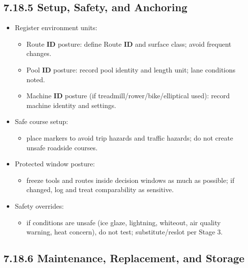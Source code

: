 \documentclass[10pt]{article}
\begin{document}
\subsection*{7.18.5 Setup, Safety, and Anchoring}
{}

\begin{itemize}
\item Register environment units:
  \begin{itemize}
  \item Route \textbf{ID} posture: define Route \textbf{ID} and surface class; avoid frequent changes.
  \item Pool \textbf{ID} posture: record pool identity and length unit; lane conditions noted.
  \item Machine \textbf{ID} posture (if treadmill/rower/bike/elliptical used): record machine identity and settings.
  \end{itemize}
\item Safe course setup:
  \begin{itemize}
  \item place markers to avoid trip hazards and traffic hazards; do not create unsafe roadside courses.
  \end{itemize}
\item Protected window posture:
  \begin{itemize}
  \item freeze tools and routes inside decision windows as much as possible; if changed, log and treat comparability as sensitive.
  \end{itemize}
\item Safety overrides:
  \begin{itemize}
  \item if conditions are unsafe (ice glaze, lightning, whiteout, air quality warning, heat concern), do not test; substitute/reslot per Stage 3.
  \end{itemize}
\end{itemize}

\subsection*{7.18.6 Maintenance, Replacement, and Storage}
{}
\end{document}

